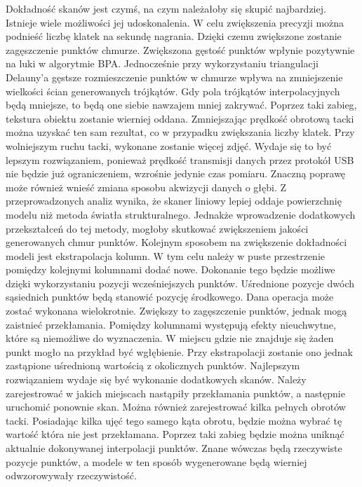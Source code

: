 Dokładność skanów jest czymś, na czym należałoby się skupić najbardziej. Istnieje wiele możliwości jej udoskonalenia. W celu zwiększenia precyzji można podnieść liczbę klatek na sekundę nagrania. Dzięki czemu zwiększone zostanie zagęszczenie punktów chmurze. Zwiększona gęstość punktów wpłynie pozytywnie na luki w algorytmie BPA. Jednocześnie przy wykorzystaniu triangulacji Delauny'a gęstsze rozmieszczenie punktów w chmurze wpływa na zmniejszenie wielkości ścian generowanych trójkątów. Gdy pola trójkątów interpolacyjnych będą mniejsze, to będą one siebie nawzajem mniej zakrywać. Poprzez taki zabieg, tekstura obiektu zostanie wierniej oddana. Zmniejszając prędkość obrotową tacki można uzyskać ten sam rezultat, co w przypadku zwiększania liczby klatek. Przy wolniejszym ruchu tacki, wykonane zostanie więcej zdjęć. Wydaje się to być lepszym rozwiązaniem, ponieważ prędkość transmisji danych przez protokół USB nie będzie już ograniczeniem, wzrośnie jedynie czas pomiaru. Znaczną poprawę może również wnieść zmiana sposobu akwizycji danych o głębi. Z przeprowadzonych analiz wynika, że skaner liniowy lepiej oddaje powierzchnię modelu niż metoda światła strukturalnego. Jednakże wprowadzenie dodatkowych przekształceń do tej metody, mogłoby skutkować zwiększeniem jakości generowanych chmur punktów. Kolejnym sposobem na zwiększenie dokładności modeli jest ekstrapolacja kolumn. W tym celu należy w puste przestrzenie pomiędzy kolejnymi kolumnami dodać nowe. Dokonanie tego będzie możliwe dzięki wykorzystaniu pozycji wcześniejszych punktów. Uśrednione pozycje dwóch sąsiednich punktów będą stanowić pozycję środkowego. Dana operacja może zostać wykonana wielokrotnie. Zwiększy to zagęszczenie punktów, jednak mogą zaistnieć przekłamania. Pomiędzy kolumnami występują efekty nieuchwytne, które są niemożliwe do wyznaczenia. W miejscu gdzie nie znajduje się żaden punkt mogło na przykład być wgłębienie. Przy ekstrapolacji zostanie ono jednak zastąpione uśrednioną wartością z okolicznych punktów. Najlepszym rozwiązaniem wydaje się być wykonanie dodatkowych skanów. Należy zarejestrować w jakich miejscach nastąpiły przekłamania punktów, a następnie uruchomić ponownie skan. Można również zarejestrować kilka pełnych obrotów tacki. Posiadając kilka ujęć tego samego kąta obrotu, będzie można wybrać tę wartość która nie jest przekłamana. Poprzez taki zabieg będzie można uniknąć aktualnie dokonywanej interpolacji punktów. Znane wówczas będą rzeczywiste pozycje punktów, a modele w ten sposób wygenerowane będą wierniej odwzorowywały rzeczywistość. 
 
